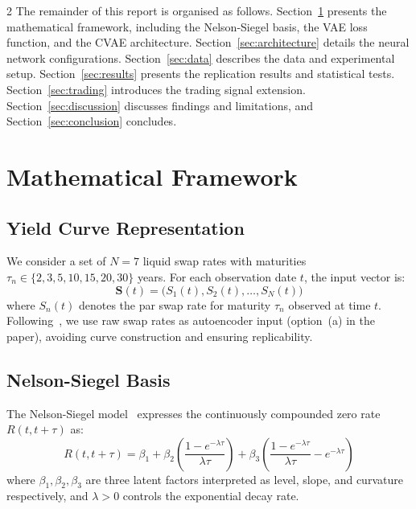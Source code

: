 \documentclass[10pt,a4paper]{article}
\theoremstyle{plain}
\theoremstyle{definition}
\begin{document}
\begin{multicols}{2}
The remainder of this report is organised as follows. Section~\ref{sec:framework} presents the mathematical framework, including the Nelson-Siegel basis, the VAE loss function, and the CVAE architecture. Section~\ref{sec:architecture} details the neural network configurations. Section~\ref{sec:data} describes the data and experimental setup. Section~\ref{sec:results} presents the replication results and statistical tests. Section~\ref{sec:trading} introduces the trading signal extension. Section~\ref{sec:discussion} discusses findings and limitations, and Section~\ref{sec:conclusion} concludes.

\section{Mathematical Framework}\label{sec:framework}

\subsection{Yield Curve Representation}

We consider a set of $N=7$ liquid swap rates with maturities $\tau_n \in \{2, 3, 5, 10, 15, 20, 30\}$ years. For each observation date $t$, the input vector is:
\begin{equation}
\mathbf{S}(t) = \bigl(S_1(t), S_2(t), \ldots, S_N(t)\bigr)
\end{equation}
where $S_n(t)$ denotes the par swap rate for maturity $\tau_n$ observed at time $t$. Following~\cite{sokol2022}, we use raw swap rates as autoencoder input (option~(a) in the paper), avoiding curve construction and ensuring replicability.

\subsection{Nelson-Siegel Basis}

The Nelson-Siegel model~\cite{nelson1987} expresses the continuously compounded zero rate $R(t, t+\tau)$ as:
\begin{equation}\label{eq:ns_zero}
R(t, t+\tau) = \beta_1 + \beta_2 \left(\frac{1 - e^{-\lambda\tau}}{\lambda\tau}\right) + \beta_3 \left(\frac{1 - e^{-\lambda\tau}}{\lambda\tau} - e^{-\lambda\tau}\right)
\end{equation}
where $\beta_1, \beta_2, \beta_3$ are three latent factors interpreted as level, slope, and curvature respectively, and $\lambda > 0$ controls the exponential decay rate.


\end{multicols}
\end{document}
